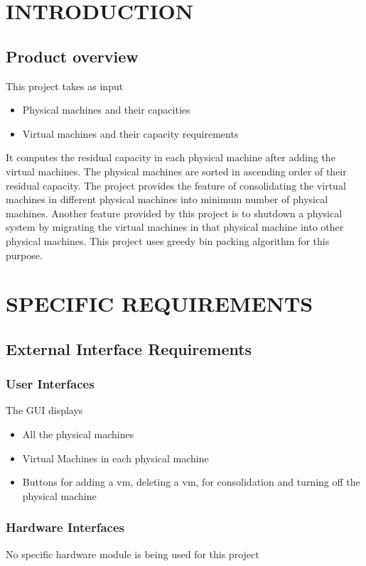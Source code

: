 \documentclass[a4paper,11pt]{article}
\begin{document}
	\section{INTRODUCTION}
		\subsection{Product overview}
		This project takes as  input 
		\begin{itemize}
		  \item Physical machines and their capacities
		  \item Virtual machines and their capacity requirements
		  
		\end{itemize} 
		It computes the residual capacity in each physical machine after adding the 
		virtual machines. The physical machines are sorted in ascending order of their residual capacity. 
		The project provides the feature of consolidating the virtual machines in different physical machines into 
		minimum number of physical machines. Another feature provided by this project is to shutdown a physical system
		by migrating the virtual machines in that physical machine into other physical machines. This project uses
		greedy bin packing algorithm for this purpose. \section{SPECIFIC REQUIREMENTS}
		\subsection{External Interface Requirements}
			\subsubsection{User Interfaces}
			The GUI displays 
			\begin{itemize}
				\item All the physical machines
				\item Virtual Machines in each physical machine
				\item Buttons for adding a vm, deleting a vm, for consolidation and turning off 
				the physical machine
			\end{itemize}

			\subsubsection{Hardware Interfaces}
			No specific hardware module is being used for this project
\end{document}

